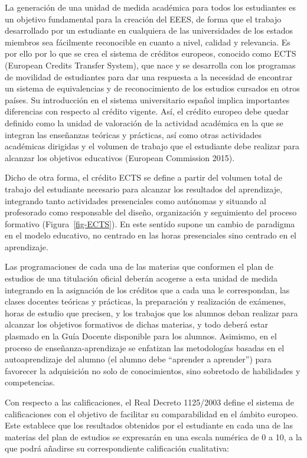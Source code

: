 \documentclass[
  11pt,
  a4paper,
  twoside]{scrreprt}
\begin{document}
La generación de una unidad de medida académica para todos los
estudiantes es un objetivo fundamental para la creación del EEES, de
forma que el trabajo desarrollado por un estudiante en cualquiera de las
universidades de los estados miembros sea fácilmente reconocible en
cuanto a nivel, calidad y relevancia. Es por ello por lo que se crea el
sistema de créditos europeos, conocido como ECTS (European Credits
Transfer System), que nace y se desarrolla con los programas de
movilidad de estudiantes para dar una respuesta a la necesidad de
encontrar un sistema de equivalencias y de reconocimiento de los
estudios cursados en otros países. Su introducción en el sistema
universitario español implica importantes diferencias con respecto al
crédito vigente. Así, el crédito europeo debe quedar definido como la
unidad de valoración de la actividad académica en la que se integran las
enseñanzas teóricas y prácticas, así como otras actividades académicas
dirigidas y el volumen de trabajo que el estudiante debe realizar para
alcanzar los objetivos educativos (European Commission 2015).

Dicho de otra forma, el crédito ECTS se define a partir del volumen
total de trabajo del estudiante necesario para alcanzar los resultados
del aprendizaje, integrando tanto actividades presenciales como
autónomas y situando al profesorado como responsable del diseño,
organización y seguimiento del proceso formativo
(Figura~\ref{fig-ECTS}). En este sentido supone un cambio de paradigma
en el modelo educativo, no centrado en las horas presenciales sino
centrado en el aprendizaje.

Las programaciones de cada una de las materias que conformen el plan de
estudios de una titulación oficial deberán acogerse a esta unidad de
medida integrando en la asignación de los créditos que a cada una le
correspondan, las clases docentes teóricas y prácticas, la preparación y
realización de exámenes, horas de estudio que precisen, y los trabajos
que los alumnos deban realizar para alcanzar los objetivos formativos de
dichas materias, y todo deberá estar plasmado en la Guía Docente
disponible para los alumnos. Asimismo, en el proceso de
enseñanza-aprendizaje se enfatizan las metodologías basadas en el
autoaprendizaje del alumno (el alumno debe ``aprender a aprender'') para
favorecer la adquisición no solo de conocimientos, sino sobretodo de
habilidades y competencias.

Con respecto a las calificaciones, el Real Decreto 1125/2003 define el
sistema de calificaciones con el objetivo de facilitar su comparabilidad
en el ámbito europeo. Este establece que los resultados obtenidos por el
estudiante en cada una de las materias del plan de estudios se
expresarán en una escala numérica de 0 a 10, a la que podrá añadirse su
correspondiente calificación cualitativa:
\end{document}

